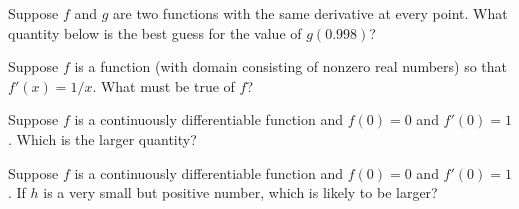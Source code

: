 \documentclass{ximera}
\newcommand{\recommendation}[1]{}
\begin{document}
\begin{problem}
  Suppose $f$ and $g$ are two functions with the same derivative at every point.  What quantity below is the best guess for the value of $g(0.998)$?
  \begin{multipleChoice}
  \end{multipleChoice}
\end{problem}

\begin{problem}
  Suppose $f$ is a function (with domain consisting of nonzero real numbers) so that $f'(x) = 1/x$.  What must be true of $f$?
  \begin{multipleChoice}
  \end{multipleChoice}
\end{problem}



\begin{problem}
  Suppose $f$ is a continuously differentiable function and $f(0) = 0$ and $f'(0) = 1$.  Which is the larger quantity?
  \begin{multipleChoice}
  \end{multipleChoice}
\end{problem}

\begin{problem}
  Suppose $f$ is a continuously differentiable function and $f(0) = 0$ and $f'(0) = 1$. If $h$ is a very small but positive number, which is likely to be larger?
  \begin{multipleChoice}
  \end{multipleChoice}
\end{problem}
\end{document}
